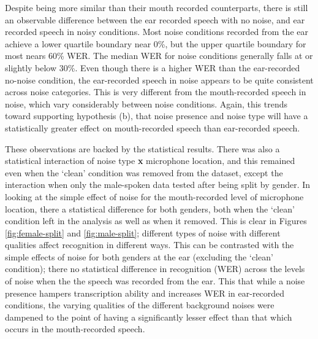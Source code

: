 Despite being more similar than their mouth recorded counterparts, there is still an observable difference between the ear recorded speech with no noise, and ear recorded speech in noisy conditions.  Most noise conditions recorded from the ear achieve a lower quartile boundary near 0\%, but the upper quartile boundary for most nears 60\% WER.  The median WER for noise conditions generally falls at or slightly below 30\%. 
Even though there is a higher WER than the ear-recorded no-noise condition, the ear-recorded speech in noise appears to be quite consistent across noise categories.  This is very different from the mouth-recorded speech in noise, which vary considerably between noise conditions. Again, this trends toward supporting hypothesis (b), that noise presence and noise type will have a statistically greater effect on mouth-recorded speech than ear-recorded speech.

These observations are backed by the statistical results.  There was also a statistical interaction of noise type \textbf{x} microphone location, and this remained even when the `clean' condition was removed from the dataset, except the interaction \DIFdelbegin {}\DIFdelend \DIFaddbegin {}\DIFaddend when only the male-spoken data \DIFdelbegin {}\DIFdelend \DIFaddbegin {}\DIFaddend tested after being split by gender.  In looking at the simple effect of noise for the mouth-recorded level of microphone location, there \DIFdelbegin {}\DIFdelend \DIFaddbegin {}\DIFaddend a statistical difference for both genders, both when the `clean' condition \DIFdelbegin {}\DIFdelend \DIFaddbegin {}\DIFaddend left in the analysis as well as when it \DIFdelbegin {}\DIFdelend \DIFaddbegin {}\DIFaddend removed.  This is \DIFdelbegin {}\DIFdelend clear in Figures \ref{fig:female-split} and \ref{fig:male-split}\DIFdelbegin {}\DIFdelend ; different types of noise with different qualities \DIFdelbegin {}\DIFdelend affect recognition in different ways.  This can be contrasted with the simple effects of noise for both genders at the ear (excluding the `clean' condition); there \DIFdelbegin {}\DIFdelend \DIFaddbegin {}\DIFaddend no statistical difference in recognition (WER) across the levels of noise when the the speech was recorded from the ear.  This \DIFdelbegin {}\DIFdelend \DIFaddbegin {}\DIFaddend that while a noise presence hampers transcription ability and increases WER in ear-recorded conditions, the varying qualities of the different background noises were dampened to the point of having a significantly lesser effect than that which occurs in the mouth-recorded speech.

